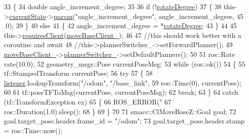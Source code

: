 \begin{DoxyCode}
33     \{
34         \textcolor{keywordtype}{double} angle\_increment\_degree;
35 
36         \textcolor{keywordflow}{if} (!\hyperlink{classsm__dance__bot_1_1move__base__z__client_1_1CbRotate_ab1ecbec2a3e65f6339d176f440e2e2f3}{rotateDegree})
37         \{
38             this->\hyperlink{classsmacc_1_1SmaccClientBehavior_af76fc9b877542ed5caf033f820c107d0}{currentState}->\hyperlink{classsmacc_1_1ISmaccState_a4982f2187ed6da337462721146e8ef70}{param}(\textcolor{stringliteral}{"angle\_increment\_degree"}, angle\_increment\_degree, 45
      .0);
39         \}
40         \textcolor{keywordflow}{else}
41         \{
42             angle\_increment\_degree = *\hyperlink{classsm__dance__bot_1_1move__base__z__client_1_1CbRotate_ab1ecbec2a3e65f6339d176f440e2e2f3}{rotateDegree};
43         \}
44 
45         this->\hyperlink{classsmacc_1_1SmaccClientBehavior_a917f001e763a1059af337bf4e164f542}{requiresClient}(\hyperlink{classsm__dance__bot_1_1move__base__z__client_1_1CbRotate_acf8790630271d1180e2b9936edc4eb79}{moveBaseClient\_});
46 
47         \textcolor{comment}{//this should work better with a coroutine and await}
48         \textcolor{comment}{//this->plannerSwitcher\_->setForwardPlanner();}
49         \hyperlink{classsm__dance__bot_1_1move__base__z__client_1_1CbRotate_acf8790630271d1180e2b9936edc4eb79}{moveBaseClient\_}->\hyperlink{classsmacc_1_1ClMoveBaseZ_a712e0df77c9629930e03cbb4c539b485}{plannerSwitcher\_}->setDefaultPlanners();
50 
51         ros::Rate rate(10.0);
52         geometry\_msgs::Pose currentPoseMsg;
53         \textcolor{keywordflow}{while} (ros::ok())
54         \{
55             tf::StampedTransform currentPose;
56             \textcolor{keywordflow}{try}
57             \{
58                 \hyperlink{classsm__dance__bot_1_1move__base__z__client_1_1CbRotate_a378ab8e6db83063793e07f8ebdae6d2c}{listener}.lookupTransform(\textcolor{stringliteral}{"/odom"}, \textcolor{stringliteral}{"/base\_link"},
59                                          ros::Time(0), currentPose);
60 
61                 tf::poseTFToMsg(currentPose, currentPoseMsg);
62                 \textcolor{keywordflow}{break};
63             \}
64             \textcolor{keywordflow}{catch} (tf::TransformException ex)
65             \{
66                 ROS\_ERROR(\textcolor{stringliteral}{"%
67                 ros::Duration(1.0).sleep();
68             \}
69         \}
70 
71         smacc::ClMoveBaseZ::Goal goal;
72         goal.target\_pose.header.frame\_id = \textcolor{stringliteral}{"/odom"};
73         goal.target\_pose.header.stamp = ros::Time::now();
}
\end{DoxyCode}
